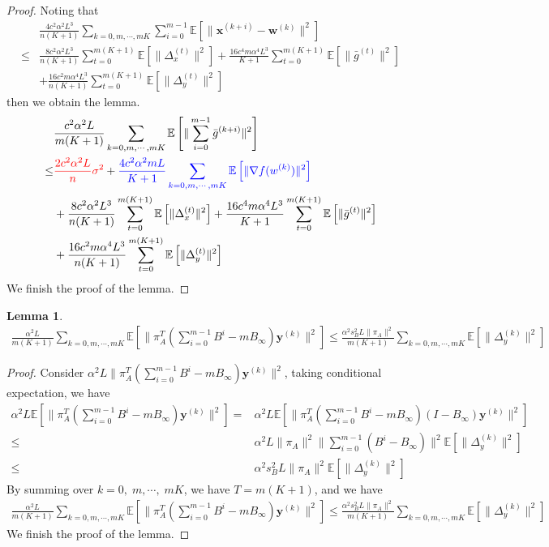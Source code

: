 \documentclass{article}
\newtheorem{lemma}[thm]{Lemma}
\newcommand{\vw}{{\mathbf{w}}}
\newcommand{\vx}{{\mathbf{x}}}
\newcommand{\vy}{{\mathbf{y}}}
\newcommand{\EE}[1]{\mathbb{E}\left[#1\right]}
\newcommand{\norm}[1]{\| #1 \|}
\begin{document}
\begin{proof}
Noting that 
\begin{align*}
  &\frac{4c^2\alpha^2L^3}{n(K+1)}\sum_{k=0,m,\cdots,mK}\sum_{i=0}^{m-1}\EE{\norm{\vx^{(k+i)}-\vw^{(k)}}^2}\\  \leq&\frac{8c^2\alpha^2L^3}{n(K+1)}\sum_{t=0}^{m(K+1)}\EE{\norm{\Delta_x^{(t)}}^2}+\frac{16c^4m\alpha^4L^3}{K+1}\sum_{t=0}^{m(K+1)}\EE{\norm{\bar{g}^{(t)}}^2}\\&+\frac{16c^2m\alpha^4L^3}{n(K+1)}\sum_{t=0}^{m(K+1)}\EE{\norm{\Delta_y^{(t)}}^2}
\end{align*}
then we obtain the lemma.
\begin{align*}
  &\frac{c^2\alpha^2L}{m(K+1)}\sum_{k=0,m,\cdots,mK}\EE{\norm{\sum_{i=0}^{m-1}\bar{g}^{(k+i)}}^2}
  \\ \leq& \textcolor{red}{ \frac{2c^2\alpha^2L}{n}\sigma^2}+ \textcolor{blue}{\frac{4c^2\alpha^2mL}{K+1}\sum_{k=0,m,\cdots,mK}\EE{\norm{\nabla f(w^{(k)})}^2}}\\&+\frac{8c^2\alpha^2L^3}{n(K+1)}\sum_{t=0}^{m(K+1)}\EE{\norm{\Delta_x^{(t)}}^2}+\frac{16c^4m\alpha^4L^3}{K+1}\sum_{t=0}^{m(K+1)}\EE{\norm{\bar{g}^{(t)}}^2}\\&+\frac{16c^2m\alpha^4L^3}{n(K+1)}\sum_{t=0}^{m(K+1)}\EE{\norm{\Delta_y^{(t)}}^2}
\end{align*}
We finish the proof of the lemma.
\end{proof}

\begin{lemma}\label{Convergence Analysis: Quadratic Term-Decomposition-2}
  \begin{align*}
    \frac{\alpha^2L}{m(K+1)}\sum_{k=0,m,\cdots,mK}\EE{\norm{\pi_A^T(\sum_{i=0}^{m-1}B^i - m B_{\infty})\vy^{(k)}}^2}\leq \frac{\alpha^2s_B^2L\norm{\pi_A}^2}{m(K+1)}\sum_{k=0,m,\cdots,mK}\EE{\norm{\Delta_y^{(k)}}^2}
  \end{align*}
\end{lemma}

\begin{proof}
  Consider $\alpha^2L\norm{\pi_A^T(\sum_{i=0}^{m-1}B^i - m B_{\infty})\vy^{(k)}}^2$, taking conditional expectation, we have
  \begin{align*}
    \alpha^2L\EE{\norm{\pi_A^T(\sum_{i=0}^{m-1}B^i - m B_{\infty})\vy^{(k)}}^2}=&\alpha^2L\EE{\norm{\pi_A^T(\sum_{i=0}^{m-1}B^i - m B_{\infty})(I-B_{\infty})\vy^{(k)}}^2}\\
    \leq & \alpha^2L\norm{\pi_A}^2\norm{\sum_{i=0}^{m-1}(B^i-B_{\infty})}^2\EE{\norm{\Delta_y^{(k)}}^2}\\ 
    \leq & \alpha^2s_B^2L\norm{\pi_A}^2\EE{\norm{\Delta_y^{(k)}}^2}
  \end{align*}
  By summing over $k=0,\;m,\cdots,\;mK$, we have $T=m(K+1)$, and we have
  \begin{align*}
    \frac{\alpha^2L}{m(K+1)}\sum_{k=0,m,\cdots,mK}\EE{\norm{\pi_A^T(\sum_{i=0}^{m-1}B^i - m B_{\infty})\vy^{(k)}}^2}\leq \frac{\alpha^2s_B^2L\norm{\pi_A}^2}{m(K+1)}\sum_{k=0,m,\cdots,mK}\EE{\norm{\Delta_y^{(k)}}^2}
  \end{align*}
  We finish the proof of the lemma.
\end{proof}
\end{document}

